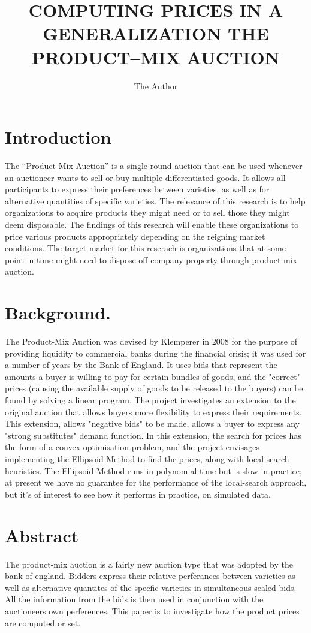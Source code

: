 \documentclass[11pt]{article} %
\title{COMPUTING PRICES IN A GENERALIZATION THE PRODUCT–MIX AUCTION}
\author{The Author}
\begin{document}
\maketitle

\section{Introduction}

The “Product-Mix Auction” is a single-round auction that can be used whenever an auctioneer wants to sell or buy multiple differentiated goods. It allows all participants to express their preferences between varieties, as well as for alternative quantities of specific varieties.
The relevance of this research is to help organizations to acquire products they might need or to sell those they might deem disposable. The findings of this research will enable these organizations to price various products appropriately depending on the reigning market conditions. The target market for this reserach is organizations that at some point in time might need to dispose off company property through product-mix auction.

\section{Background.}
The Product-Mix Auction was devised by Klemperer in 2008 for the purpose of providing liquidity to commercial banks during the financial crisis; it was used for a number of years by the Bank of England.
It uses bids that represent the amounts a buyer is willing to pay for certain bundles of goods, and the "correct" prices (causing the available supply of goods to be released to the buyers) can be found by solving a linear program. The project investigates an extension to the original auction that allows buyers more flexibility to express their requirements. 
This extension, allows "negative bids" to be made, allows a buyer to express any "strong substitutes" demand function. In this extension, the search for prices has the form of a convex optimisation problem, and the project envisages implementing the Ellipsoid Method to find the prices, along with local search heuristics. The Ellipsoid Method runs in polynomial time but is slow in practice; at present we have no guarantee for the performance of the local-search approach, but it's of interest to see how it performs in practice, on simulated data.

\section{Abstract}
The product-mix auction is a fairly new auction type that was adopted by the bank of england. 
Bidders express their relative perferances between varieties as well as alternative quantites of the specfic varieties in simultaneous sealed bids.
 All the information from the bids is then used in conjunction with the auctioneers own perferences. This paper is to investigate how the product prices are computed or set.
\end{document}
